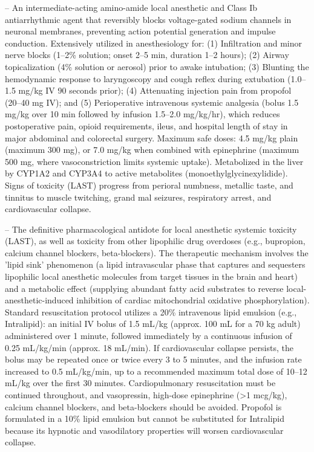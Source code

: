 -- An intermediate-acting amino-amide local anesthetic and Class Ib antiarrhythmic agent that reversibly blocks voltage-gated sodium channels in neuronal membranes, preventing action potential generation and impulse conduction. Extensively utilized in anesthesiology for: (1) Infiltration and minor nerve blocks (1--2\% solution; onset 2--5 min, duration 1--2 hours); (2) Airway topicalization (4\% solution or aerosol) prior to awake intubation; (3) Blunting the hemodynamic response to laryngoscopy and cough reflex during extubation (1.0--1.5 mg/kg IV 90 seconds prior); (4) Attenuating injection pain from propofol (20--40 mg IV); and (5) Perioperative intravenous systemic analgesia (bolus 1.5 mg/kg over 10 min followed by infusion 1.5--2.0 mg/kg/hr), which reduces postoperative pain, opioid requirements, ileus, and hospital length of stay in major abdominal and colorectal surgery. Maximum safe doses: 4.5 mg/kg plain (maximum 300 mg), or 7.0 mg/kg when combined with epinephrine (maximum 500 mg, where vasoconstriction limits systemic uptake). Metabolized in the liver by CYP1A2 and CYP3A4 to active metabolites (monoethylglycinexylidide). Signs of toxicity (LAST) progress from perioral numbness, metallic taste, and tinnitus to muscle twitching, grand mal seizures, respiratory arrest, and cardiovascular collapse.

-- The definitive pharmacological antidote for local anesthetic systemic toxicity (LAST), as well as toxicity from other lipophilic drug overdoses (e.g., bupropion, calcium channel blockers, beta-blockers). The therapeutic mechanism involves the 'lipid sink' phenomenon (a lipid intravascular phase that captures and sequesters lipophilic local anesthetic molecules from target tissues in the brain and heart) and a metabolic effect (supplying abundant fatty acid substrates to reverse local-anesthetic-induced inhibition of cardiac mitochondrial oxidative phosphorylation). Standard resuscitation protocol utilizes a 20\% intravenous lipid emulsion (e.g., Intralipid): an initial IV bolus of 1.5 mL/kg (approx. 100 mL for a 70 kg adult) administered over 1 minute, followed immediately by a continuous infusion of 0.25 mL/kg/min (approx. 18 mL/min). If cardiovascular collapse persists, the bolus may be repeated once or twice every 3 to 5 minutes, and the infusion rate increased to 0.5 mL/kg/min, up to a recommended maximum total dose of 10--12 mL/kg over the first 30 minutes. Cardiopulmonary resuscitation must be continued throughout, and vasopressin, high-dose epinephrine (>1 mcg/kg), calcium channel blockers, and beta-blockers should be avoided. Propofol is formulated in a 10\% lipid emulsion but cannot be substituted for Intralipid because its hypnotic and vasodilatory properties will worsen cardiovascular collapse.

